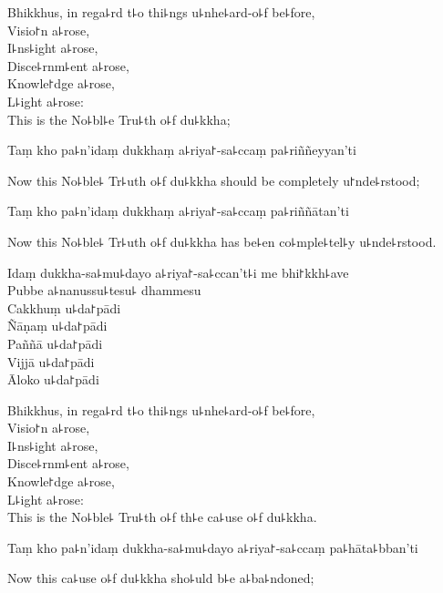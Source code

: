 \begin{english}
  Bhikkhus, in rega꜕rd t꜕o thi꜕ngs u꜕nhe꜕ard-o꜕f be꜕fore,\\
  Visio꜓n a꜕rose,\\
  I꜕ns꜕ight a꜕rose,\\
  Disce꜕rnm꜕ent a꜕rose,\\
  Knowle꜓dge a꜕rose,\\
  L꜕ight a꜕rose:\\
  This is the No꜕bl꜕e Tru꜕th o꜕f du꜕kkha;
\end{english}

Taṃ kho pa꜕n'idaṃ dukkhaṃ a꜕riya꜓-sa꜕ccaṃ pa꜕riññeyyan'ti

\begin{english}
  Now this No꜕ble꜕ Tr꜕uth o꜕f du꜕kkha should be completely u꜓nde꜕rstood;
\end{english}

Taṃ kho pa꜕n'idaṃ dukkhaṃ a꜕riya꜓-sa꜕ccaṃ pa꜕riññātan'ti

\begin{english}
  Now this No꜕ble꜕ Tr꜕uth o꜕f du꜕kkha has be꜕en co꜕mple꜕tel꜕y u꜕nde꜕rstood.
\end{english}

\ifaivedition
\clearpage
\fi

Idaṃ dukkha-sa꜕mu꜕dayo a꜕riya꜓-sa꜕ccan't꜕i me bhi꜓kkh꜕ave\\
Pubbe a꜕nanussu꜕tesu꜕ dhammesu\\
Cakkhuṃ u꜕da꜓pādi\\
Ñāṇaṃ u꜕da꜓pādi\\
Paññā u꜕da꜓pādi\\
Vijjā u꜕da꜓pādi\\
Āloko u꜕da꜓pādi

\begin{english}
  Bhikkhus, in rega꜕rd t꜕o thi꜕ngs u꜕nhe꜕ard-o꜕f be꜕fore,\\
  Visio꜓n a꜕rose,\\
  I꜕ns꜕ight a꜕rose,\\
  Disce꜕rnm꜕ent a꜕rose,\\
  Knowle꜓dge a꜕rose,\\
  L꜕ight a꜕rose:\\
  This is the No꜕ble꜕ Tru꜕th o꜕f th꜕e ca꜕use o꜕f du꜕kkha.
\end{english}

Taṃ kho pa꜕n'idaṃ dukkha-sa꜕mu꜕dayo a꜕riya꜓-sa꜕ccaṃ pa꜕hāta꜕bban'ti

\begin{english}
  Now this ca꜕use o꜕f du꜕kkha sho꜕uld b꜕e a꜕ba꜕ndoned;
\end{english}


